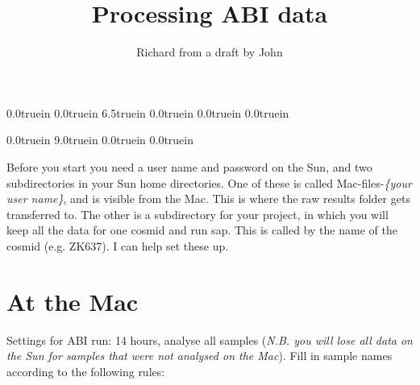 
\oddsidemargin  0.0truein
\evensidemargin 0.0truein
\textwidth      6.5truein
\marginparwidth 0.0truein
\marginparsep   0.0truein
\marginparpush  0.0truein

\topmargin      0.0truein
\textheight     9.0truein
\headheight     0.0truein
\headsep        0.0truein

\setlength{\parskip}{0.25\baselineskip}

\title{Processing ABI data}

\author{Richard from a draft by John}



\maketitle

Before you start you need a user name and password on the Sun, and two
subdirectories in your Sun home directories.  One of these is called
{\sf Mac-files-{\em \{your user name\}}}, and is visible from the Mac.
This is where the raw results folder gets transferred to.  The other
is a subdirectory for your project, in which you will keep all the
data for one cosmid and run {\sf sap}.  This is called by the name of
the cosmid (e.g. ZK637). I can help set these up.

\section{At the Mac}

Settings for ABI run: 14 hours, analyse all samples ({\em N.B. you
will lose all data on the Sun for samples that were not analysed on
the Mac}). Fill in sample names according to the following rules:

